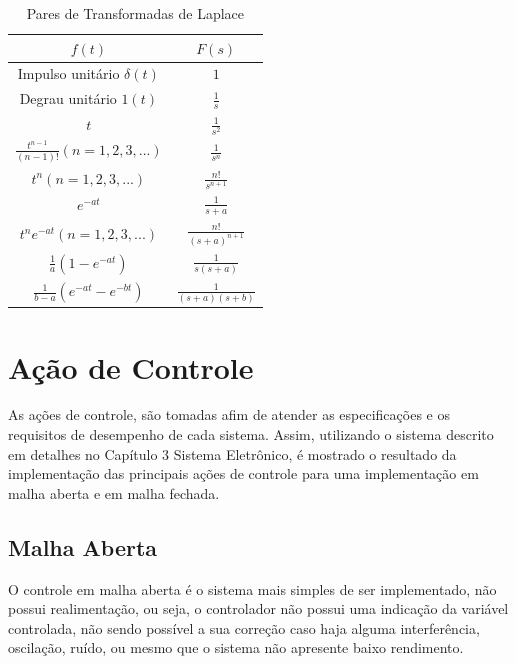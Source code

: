 \begin{table}[h]
\centering
\caption{Pares de Transformadas de Laplace}
\label{tab:Laplace}
\begin{tabular}{c|c}
\hline
$f(t)$ & $F(s)$ \\
\hline
\hline
Impulso unitário $\delta(t)$ 		& $1$ 			\\ \hline
Degrau unitário $1(t)$ 			& $\frac{1}{s}$		\\ \hline
$t$ 					& $\frac{1}{s^2}$ 	\\ \hline
$\frac{t^{n-1}}{(n-1)!} (n=1,2,3,...)$ 	& $\frac{1}{s^n}$ 	\\ \hline
$t^n (n=1,2,3,...)$ 			& $\frac{n!}{s^{n+1}}$ 	\\ \hline
$e^{-at}$ 				& $\frac{1}{s+a}$ 	\\ \hline
$t^n e^{-at} (n=1,2,3,...)$ 		& $\frac{n!}{(s+a)^{n+1}}$ \\\hline
$\frac{1}{a} (1-e^{-at})$ 		& $\frac{1}{s(s+a)}$ 	\\ \hline
$\frac{1}{b-a}(e^{-at}-e^{-bt})$ 	& $\frac{1}{(s+a)(s+b)}$ \\ \hline
\end{tabular}
\end{table}






\section{Ação de Controle}

As ações de controle, são tomadas afim de atender as especificações e os requisitos de desempenho de cada sistema. Assim, utilizando o sistema descrito em detalhes no Capítulo 3 Sistema Eletrônico, é mostrado o resultado da implementação das principais ações de controle para uma implementação em malha aberta e em malha fechada.

\subsection{ Malha Aberta }

O controle em malha aberta é o sistema mais simples de ser implementado, não possui realimentação, ou seja, o controlador não possui uma indicação da variável controlada, não sendo possível a sua correção caso haja alguma interferência, oscilação, ruído, ou mesmo que o sistema não apresente baixo rendimento.

